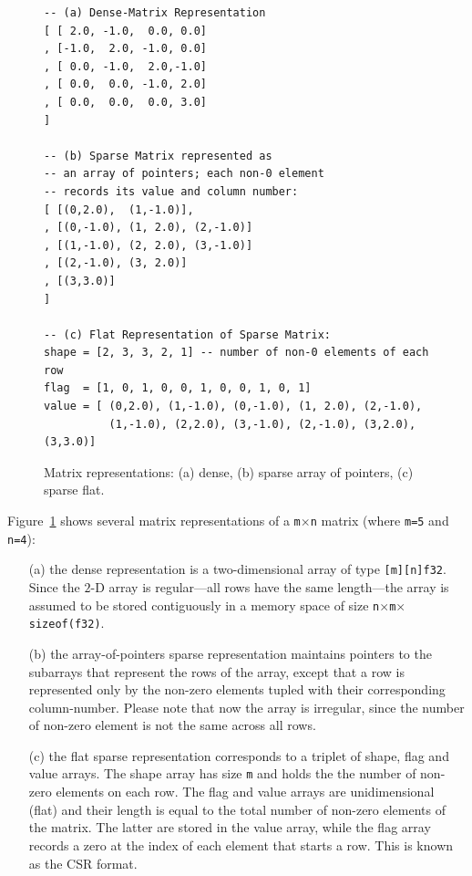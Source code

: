 \documentclass[acmsmall,review]{acmart}\settopmatter{printfolios=true,printccs=false,printacmref=false}
\begin{document}
\begin{figure}
\begin{lstlisting}[mathescape=true]
-- (a) Dense-Matrix Representation
[ [ 2.0, -1.0,  0.0, 0.0]              
, [-1.0,  2.0, -1.0, 0.0]
, [ 0.0, -1.0,  2.0,-1.0]
, [ 0.0,  0.0, -1.0, 2.0]
, [ 0.0,  0.0,  0.0, 3.0]
]

-- (b) Sparse Matrix represented as 
-- an array of pointers; each non-0 element 
-- records its value and column number:
[ [(0,2.0),  (1,-1.0)],
, [(0,-1.0), (1, 2.0), (2,-1.0)]
, [(1,-1.0), (2, 2.0), (3,-1.0)]
, [(2,-1.0), (3, 2.0)]
, [(3,3.0)]
]

-- (c) Flat Representation of Sparse Matrix:
shape = [2, 3, 3, 2, 1] -- number of non-0 elements of each row
flag  = [1, 0, 1, 0, 0, 1, 0, 0, 1, 0, 1]
value = [ (0,2.0), (1,-1.0), (0,-1.0), (1, 2.0), (2,-1.0),
          (1,-1.0), (2,2.0), (3,-1.0), (2,-1.0), (3,2.0), (3,3.0)]
\end{lstlisting}\vspace{-4ex}
\caption{ Matrix representations: (a) dense, (b) sparse array of pointers, (c) sparse flat.}
\label{fig:mat-reps}
\end{figure}


Figure~\ref{fig:mat-reps} shows several matrix representations
of a {\tt m$\times$n} matrix (where {\tt m=5} and {\tt n=4}):
\begin{itemize}
    \item[(a)] the dense representation is a two-dimensional
        array of type \lstinline{[m][n]f32}. Since the $2$-D array
        is regular---all rows have the same length---the array is 
        assumed to be stored contiguously in a memory space of
        size {\tt n$\times$m$\times$sizeof(f32)}.
    \item[(b)] the array-of-pointers sparse representation maintains
        pointers to the subarrays that represent the rows of the array,
        except that a row is represented only by the non-zero elements
        tupled with their corresponding column-number. Please note
        that now the array is irregular, since the number of non-zero
        element is not the same across all rows. 
    \item[(c)] the flat sparse representation corresponds to a triplet
        of shape, flag and value arrays. The shape array has size {\tt m}
        and holds the the number of non-zero elements on each row. The
        flag and value arrays are unidimensional (flat) and their length
        is equal to the total number of non-zero elements of the matrix.
        The latter are stored in the value array, while the flag array
        records a zero at the index of each element that starts a row.
        This is known as the CSR format.
\end{itemize}
\end{document}
